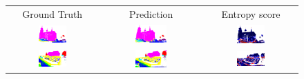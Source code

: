     \begin{figure}[h!]
        \begin{tabular}{ccc}
            Ground Truth & Prediction & Entropy score \\
            \includegraphics[width=0.33\textwidth, height=0.18\textheight]{images/seg_output/sem3d_seg_output/1_GT.png} &
            \includegraphics[width=0.33\textwidth, height=0.18\textheight]{images/seg_output/sem3d_seg_output/1_Pred.png}& 
            \includegraphics[width=0.33\textwidth, height=0.18\textheight]{images/seg_output/sem3d_seg_output/1_Entropy.png}\\

            \includegraphics[width=0.33\textwidth, height=0.18\textheight]{images/seg_output/sem3d_seg_output/2_GT.png} &
            \includegraphics[width=0.33\textwidth, height=0.18\textheight]{images/seg_output/sem3d_seg_output/2_Pred.png}& 
            \includegraphics[width=0.33\textwidth, height=0.18\textheight]{images/seg_output/sem3d_seg_output/2_Entropy.png}\\


\end{tabular}
\end{figure}
